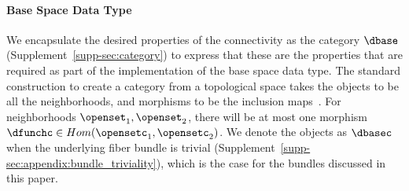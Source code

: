 \documentclass{vgtc}
\theoremstyle{definition}
\theoremstyle{remark}
\begin{document}
\paragraph{Base Space Data Type}
We encapsulate the desired properties of the connectivity as the category $\mathcal{\dbase}$ (Supplement~\autoref{supp-sec:category}) to express that these are the properties that are required as part of the implementation of the base space data type. The standard construction to create a category from a topological space takes the objects to be all the neighborhoods, and morphisms to be the inclusion maps~\cite{riehlCategoryTheoryContext2016}. For neighborhoods $\openset_1, \openset_2$, there will be at most one morphism $\dfunchc \in Hom(\opensetc_1, \opensetc_2)$. We denote the objects as $\dbasec$ when the underlying fiber bundle is trivial (Supplement~\autoref{supp-sec:appendix:bundle_triviality}), which is the case for the bundles discussed in this paper.
\end{document}
